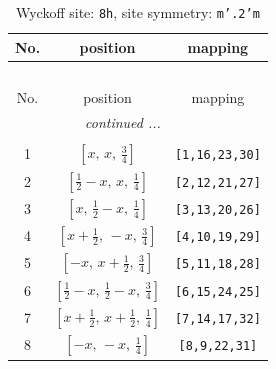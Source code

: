 \documentclass[fleqn,8pt]{jsarticle}
\begin{document}
\begin{longtable}{ccc}
\caption{Wyckoff site: {\tt 8h}, site symmetry: {\tt m'.2'm}}
 \\
 \hline \hline
No. & position & mapping \\ \hline \endfirsthead

\multicolumn{2}{l}{\tablename\ \thetable{}} \\
 \hline \hline
No. & position & mapping \\ \hline \endhead

 \hline \hline
\multicolumn{2}{r}{\footnotesize\it continued ...} \\ \endfoot

 \hline \hline
\multicolumn{2}{r}{} \\ \endlastfoot

1 & $\left[ x,\, x,\, \frac{3}{4} \right]$ & {\tt [1,16,23,30]} \\ \hline
2 & $\left[ \frac{1}{2} - x,\, x,\, \frac{1}{4} \right]$ & {\tt [2,12,21,27]} \\ \hline
3 & $\left[ x,\, \frac{1}{2} - x,\, \frac{1}{4} \right]$ & {\tt [3,13,20,26]} \\ \hline
4 & $\left[ x + \frac{1}{2},\, - x,\, \frac{3}{4} \right]$ & {\tt [4,10,19,29]} \\ \hline
5 & $\left[ - x,\, x + \frac{1}{2},\, \frac{3}{4} \right]$ & {\tt [5,11,18,28]} \\ \hline
6 & $\left[ \frac{1}{2} - x,\, \frac{1}{2} - x,\, \frac{3}{4} \right]$ & {\tt [6,15,24,25]} \\ \hline
7 & $\left[ x + \frac{1}{2},\, x + \frac{1}{2},\, \frac{1}{4} \right]$ & {\tt [7,14,17,32]} \\ \hline
8 & $\left[ - x,\, - x,\, \frac{1}{4} \right]$ & {\tt [8,9,22,31]} \\
\end{longtable}
\renewcommand{\arraystretch}{1.2}
\end{document}
